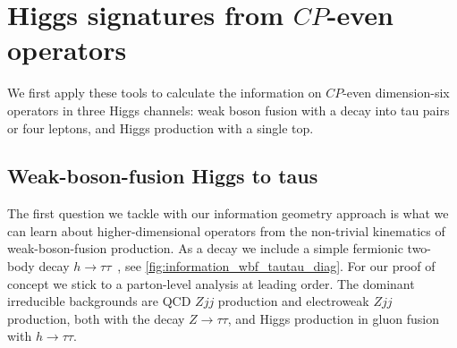 \section{Higgs signatures from $CP$-even operators}
\label{sec:information_application_even}

We first apply these tools to calculate the information on $CP$-even
dimension-six operators in three Higgs channels: weak boson fusion
with a decay into tau pairs or four leptons, and Higgs production with
a single top.



\subsection{Weak-boson-fusion Higgs to taus}
\label{sec:information_wbf_taus}

The first question we tackle with our information geometry approach is
what we can learn about higher-dimensional operators from the
non-trivial kinematics of weak-boson-fusion production. As a decay we
include a simple fermionic two-body decay
$h \to \tau \tau$~\cite{Rainwater:1998kj, Plehn:1999xi}, see
\autoref{fig:information_wbf_tautau_diag}. For our proof of concept we
stick to a parton-level analysis at leading order.  The dominant irreducible
backgrounds are QCD $Zjj$ production and electroweak $Zjj$ production,
both with the decay $Z \to \tau \tau$, and Higgs production in gluon
fusion with $h \to \tau \tau$.

